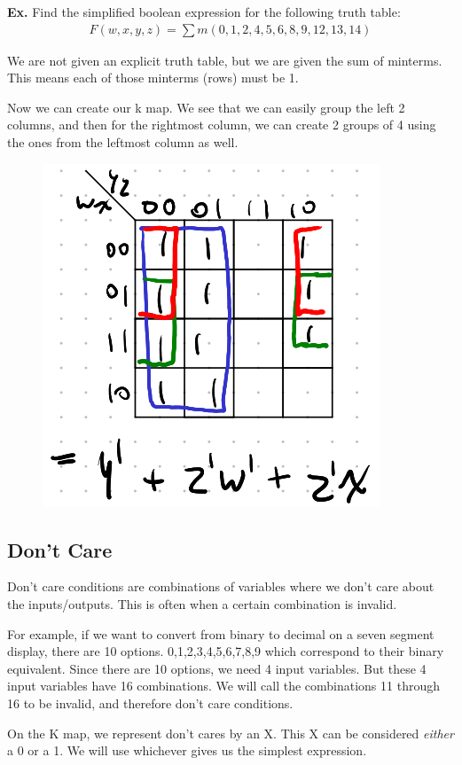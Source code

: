 \documentclass[12pt,letterpaper]{article} \usepackage{amsmath} \usepackage{graphicx}  \usepackage{longtable}  \usepackage{amssymb}
\begin{document}
        \begin{mdframed}
            \textbf{Ex. } Find the simplified boolean expression for the following truth table:
            \begin{align*}
                F(w,x,y,z) = \sum m (0,1,2,4,5,6,8,9,12,13,14)
            \end{align*}

            We are not given an explicit truth table, but we are given the sum of minterms. This means each of those minterms (rows) must be 1. 

            Now we can create our k map. We see that we can easily group the left 2 columns, and then for the rightmost column, we can create 2 groups of 4 using the ones from the leftmost column as well. 

            \begin{figure}[H]
                \centering
                \includegraphics[width=0.3\linewidth]{ex2.png}
            \end{figure}

        \end{mdframed}

        \subsection{Don't Care}
        Don't care conditions are combinations of variables where we don't care about the inputs/outputs. This is often when a certain combination is invalid. 
        
        For example, if we want to convert from binary to decimal on a seven segment display, there are 10 options. 0,1,2,3,4,5,6,7,8,9 which correspond to their binary equivalent. Since there are 10 options, we need 4 input variables. But these 4 input variables have 16 combinations. We will call the combinations 11 through 16 to be invalid, and therefore don't care conditions.

        On the K map, we represent don't cares by an X. This X can be considered \emph{either} a 0 or a 1. We will use whichever gives us the simplest expression. 
\end{document}

